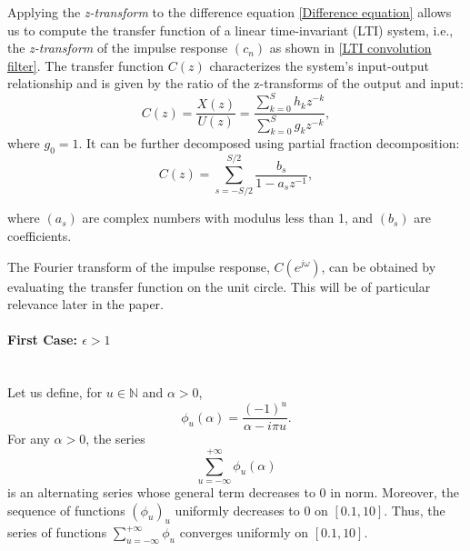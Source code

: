 Applying the \textit{z-transform} to the difference equation \ref{Difference equation} allows us to compute the transfer function of a linear time-invariant (LTI) system, i.e., the \textit{z-transform} of the impulse response \( (c_n) \) as shown in \ref{LTI convolution filter}. The transfer function \( C(z) \) characterizes the system's input-output relationship and is given by the ratio of the z-transforms of the output and input:
\[
C(z) = \frac{X(z)}{U(z)} = \frac{\sum_{k=0}^S h_k z^{-k}}{\sum_{k=0}^S g_k z^{-k}},
\]
where \( g_0 = 1 \). It can be further decomposed using partial fraction decomposition:
\begin{equation}
C(z) = \sum_{s=-S/2}^{S/2} \frac{b_s}{1 - a_s z^{-1}},
\label{Partial fraction decomposition}
\end{equation}

where \( (a_s) \) are complex numbers with modulus less than 1, and \( (b_s) \) are coefficients. 

The Fourier transform of the impulse response, \( C(e^{j\omega}) \), can be obtained by evaluating the transfer function on the unit circle. This will be of particular relevance later in the paper.

\paragraph{First Case: $\epsilon > 1$} \\
Let us define, for $u \in \mathbb{N}$ and $\alpha > 0$, 
\[
\phi_u(\alpha) = \frac{(-1)^u}{\alpha - i\pi u}.
\]
For any $\alpha > 0$, the series 
\[
\sum_{u=-\infty}^{+\infty} \phi_u(\alpha)
\]
is an alternating series whose general term decreases to 0 in norm. Moreover, the sequence of functions $(\phi_u)_u$ uniformly decreases to 0 on $[0.1, 10]$. Thus, the series of functions $\sum_{u=-\infty}^{+\infty} \phi_u$ converges uniformly on $[0.1, 10]$. 

